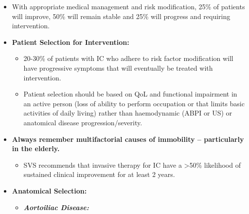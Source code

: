 \documentclass[
]{book}
\providecommand{\tightlist}{%
  \setlength{\itemsep}{0pt}\setlength{\parskip}{0pt}}
\begin{document}
\begin{itemize}
\item
  With appropriate medical management and risk modification, 25\% of
  patients will improve, 50\% will remain stable and 25\% will progress
  and requiring intervention. \citep{conte2015, norgren2007}
\item
  \textbf{Patient Selection for Intervention:}

  \begin{itemize}
  \item
    20-30\% of patients with IC who adhere to risk factor
    modification will have progressive symptoms that will eventually
    be treated with intervention.
  \item
    Patient selection should be based on QoL and functional
    impairment in an active person (loss of ability to perform
    occupation or that limits basic activities of daily living)
    rather than haemodynamic (ABPI or US) or anatomical disease
    progression/severity.
  \end{itemize}
\item
  \textbf{Always remember multifactorial causes of immobility --
  particularly in the elderly.}

  \begin{itemize}
  \tightlist
  \item
    SVS recommends that invasive therapy for IC have a \textgreater50\%
    likelihood of sustained clinical improvement for at least 2
    years.
  \end{itemize}
\item
  \textbf{Anatomical Selection:}

  \begin{itemize}
  \item
    \textbf{\emph{Aortoiliac Disease:}}


\end{itemize}
\end{itemize}
\end{document}
